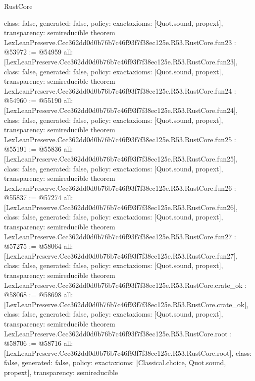 \begin{lexlean}{RustCore}
\begin{coremodule}
{  class: false,
  generated: false,
  policy: exact{axioms: [Quot.sound, propext]},
  transparency: semireducible
}
theorem LexLeanPreserve.Ccc362dd0d0b76b7c46f93f7f38ec125e.R53.RustCore.fun23 : @53972 := @54959 {
  all: [LexLeanPreserve.Ccc362dd0d0b76b7c46f93f7f38ec125e.R53.RustCore.fun23],
  class: false,
  generated: false,
  policy: exact{axioms: [Quot.sound, propext]},
  transparency: semireducible
}
theorem LexLeanPreserve.Ccc362dd0d0b76b7c46f93f7f38ec125e.R53.RustCore.fun24 : @54960 := @55190 {
  all: [LexLeanPreserve.Ccc362dd0d0b76b7c46f93f7f38ec125e.R53.RustCore.fun24],
  class: false,
  generated: false,
  policy: exact{axioms: [Quot.sound, propext]},
  transparency: semireducible
}
theorem LexLeanPreserve.Ccc362dd0d0b76b7c46f93f7f38ec125e.R53.RustCore.fun25 : @55191 := @55836 {
  all: [LexLeanPreserve.Ccc362dd0d0b76b7c46f93f7f38ec125e.R53.RustCore.fun25],
  class: false,
  generated: false,
  policy: exact{axioms: [Quot.sound, propext]},
  transparency: semireducible
}
theorem LexLeanPreserve.Ccc362dd0d0b76b7c46f93f7f38ec125e.R53.RustCore.fun26 : @55837 := @57274 {
  all: [LexLeanPreserve.Ccc362dd0d0b76b7c46f93f7f38ec125e.R53.RustCore.fun26],
  class: false,
  generated: false,
  policy: exact{axioms: [Quot.sound, propext]},
  transparency: semireducible
}
theorem LexLeanPreserve.Ccc362dd0d0b76b7c46f93f7f38ec125e.R53.RustCore.fun27 : @57275 := @58064 {
  all: [LexLeanPreserve.Ccc362dd0d0b76b7c46f93f7f38ec125e.R53.RustCore.fun27],
  class: false,
  generated: false,
  policy: exact{axioms: [Quot.sound, propext]},
  transparency: semireducible
}
theorem LexLeanPreserve.Ccc362dd0d0b76b7c46f93f7f38ec125e.R53.RustCore.crate_ok : @58068 := @58698 {
  all: [LexLeanPreserve.Ccc362dd0d0b76b7c46f93f7f38ec125e.R53.RustCore.crate_ok],
  class: false,
  generated: false,
  policy: exact{axioms: [Quot.sound, propext]},
  transparency: semireducible
}
theorem LexLeanPreserve.Ccc362dd0d0b76b7c46f93f7f38ec125e.R53.RustCore.root : @58706 := @58716 {
  all: [LexLeanPreserve.Ccc362dd0d0b76b7c46f93f7f38ec125e.R53.RustCore.root],
  class: false,
  generated: false,
  policy: exact{axioms: [Classical.choice, Quot.sound, propext]},
  transparency: semireducible
}


\end{coremodule}
\end{lexlean}
